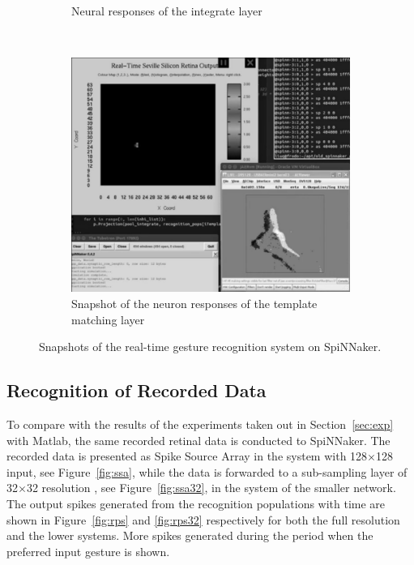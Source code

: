\documentclass[journal]{journal}
\begin{document}
\begin{figure}
\begin{subfigure}[t]{0.24\textwidth}
		\caption{Neural responses of the integrate layer~\cite{video2}}
	    \label{fig:live2}
	\end{subfigure}
	\\
	\begin{subfigure}[t]{0.48\textwidth}
		\includegraphics[width=\textwidth]{pics/live.png}
		\caption{Snapshot of the neuron responses of the template matching layer~\cite{video3}}
	    \label{fig:live3}
	\end{subfigure}	

\caption{Snapshots of the real-time gesture recognition system on SpiNNaker.
}
\label{fig:live}
\end{figure}

\subsection{Recognition of Recorded Data}
To compare with the results of the experiments taken out in Section~\ref{sec:exp} with Matlab, the same recorded retinal data is conducted to SpiNNaker. 
The recorded data is presented as Spike Source Array in the system with 128$\times$128 input, see Figure~\ref{fig:ssa}, while the data is forwarded to a sub-sampling layer of 32$\times$32 resolution 
, see Figure~\ref{fig:ssa32}, in the system of the smaller network. 
The output spikes generated from the recognition populations with time are shown in Figure~\ref{fig:rps} and \ref{fig:rps32} respectively for both the full resolution and the lower systems. 
More spikes generated during the period when the preferred input gesture is shown. 
\end{document}
